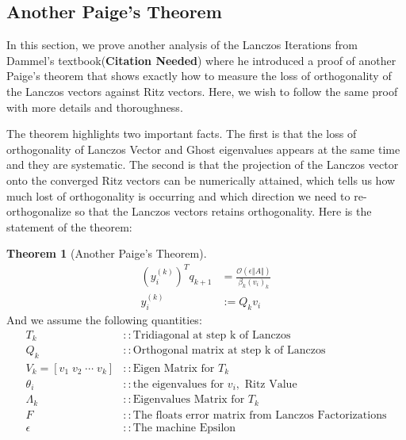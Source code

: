\documentclass[]{article}
\theoremstyle{definition}
\newtheorem{theorem}{Theorem}            %
\begin{document}
    \subsection{Another Paige's Theorem}
        In this section, we prove another analysis of the Lanczos Iterations from Dammel's textbook(\textbf{Citation Needed}) where he introduced a proof of another Paige's theorem that shows exactly how to measure the loss of orthogonality of the Lanczos vectors against Ritz vectors. Here, we wish to follow the same proof with more details and thoroughness.
        \par
        The theorem highlights two important facts. The first is that the loss of orthogonality of Lanczos Vector and Ghost eigenvalues appears at the same time and they are systematic. The second is that the projection of the Lanczos vector onto the converged Ritz vectors can be numerically attained, which tells us how much lost of orthogonality is occurring and which direction we need to re-orthogonalize so that the Lanczos vectors retains orthogonality. Here is the statement of the theorem: 
        \begin{theorem}[Another Paige's Theorem]
            \begin{align}
                (y_i^{(k)})^Tq_{k + 1} &= \frac{\mathcal O(\epsilon \Vert A\Vert)}{\beta_k (v_i)_k}    
                \\
                y_i^{(k)} &:= Q_kv_i
            \end{align}
            And we assume the following quantities: 
            \begin{align}
                T_k &:: \text{Tridiagonal at step k of Lanczos}
                \\
                Q_k &:: \text{Orthogonal matrix at step k of Lanczos}
                \\
                V_k = [v_1\;  v_2\; \cdots \; v_k] &:: \text{Eigen Matrix for } T_k
                \\
                \theta_i &:: \text{the eigenvalues for }v_i, \text{ Ritz Value}
                \\
                \Lambda_k &:: \text{Eigenvalues Matrix for }T_k
                \\
                F &::\text{The floats error matrix from Lanczos Factorizations}
                \\
                \epsilon &:: \text{The machine Epsilon}
            \end{align}

        \end{theorem}
\end{document}
